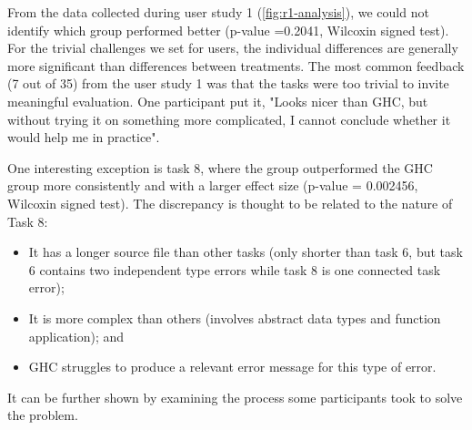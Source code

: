 From the data collected during user study 1 (\ref{fig:r1-analysis}), we could not identify which group performed better (p-value =0.2041, Wilcoxin signed test). For the trivial challenges we set for users, the individual differences are generally more significant than differences between treatments. 
The most common feedback (7 out of 35) from the user study 1 was that the tasks were too trivial to invite meaningful evaluation. One participant put it, "Looks nicer than GHC, but without trying it on something more complicated, I cannot conclude whether it would help me in practice".

One interesting exception is task 8, where the \chameleon{} group outperformed the GHC group more consistently and with a larger effect size (p-value = 0.002456, Wilcoxin signed test). The discrepancy is thought to be related to the nature of Task 8:
\begin{itemize}
    \item {It has a longer source file than other tasks (only shorter than task 6, but task
    6 contains two independent type errors while task 8 is one connected task
    error);}
    \item {It is more complex than others (involves abstract data types and function application); and
    }
    \item {
        GHC struggles to produce a relevant error message for this type of error.
    }
  \end{itemize}
It can be further shown by examining the process some participants took to solve the problem.

  




